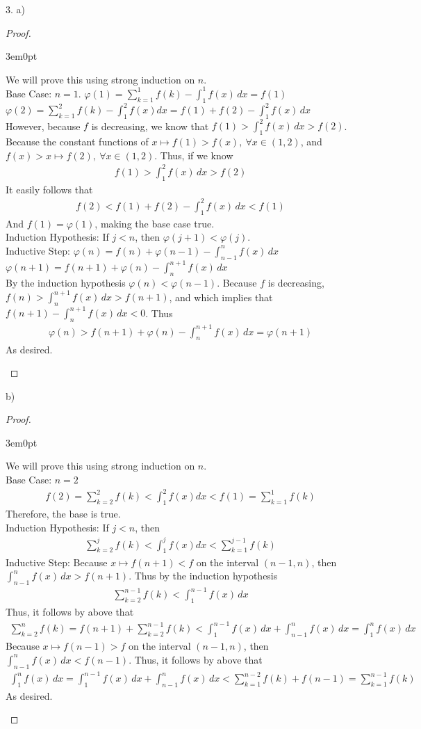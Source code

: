 \documentclass[11pt]{article}
\newcommand{\nskip}{\\ \bigskip}
\newenvironment{myproof}
{\begin{proof} \begin{adjustwidth}{3em}{0pt}$ $\par\nobreak\ignorespaces}
{\end{adjustwidth} \end{proof}}
\begin{document}
\begin{flushleft}
3. a)

\begin{myproof}
We will prove this using strong induction on $n$. \nskip
Base Case: $n=1$. $\varphi(1) = \sum_{k=1}^1f(k) - \int_1^1f(x) \,dx = f(1)$ \nskip
$\varphi(2) = \sum_{k=1}^2f(k) - \int_1^2f(x)dx = f(1) + f(2) - \int_1^2f(x)\,dx$ \nskip
However, because $f$ is decreasing, we know that $f(1) > \int_1^2f(x) \,dx > f(2)$. Because the constant functions of $x \mapsto f(1) > f(x), \ \forall x \in (1,2)$, and $f(x) > x \mapsto f(2), \ \forall x \in (1,2)$. Thus, if we know
\begin{align*}
f(1) > \int_1^2f(x) \,dx > f(2)
\end{align*}
It easily follows that
\begin{align*}
f(2) < f(1) + f(2) - \int_1^2f(x)\,dx < f(1)
\end{align*}
And $f(1) = \varphi(1)$, making the base case true. \nskip
Induction Hypothesis: If $j < n$, then $\varphi (j+1) < \varphi (j)$. \nskip
Inductive Step: $\varphi(n) = f(n) + \varphi(n-1) - \int_{n-1}^nf(x) \,dx$ \nskip
$\varphi (n+1) = f(n+1) + \varphi (n) - \int_n^{n+1} f(x) \,dx$ \nskip
By the induction hypothesis $\varphi (n) < \varphi (n-1)$.
Because $f$ is decreasing, $f(n) > \int_n^{n+1}f(x) \,dx > f(n+1) $, and which implies that $f(n+1) - \int_n^{n+1}f(x) \,dx < 0$. Thus
\begin{align*}
\varphi(n) > f(n+1) + \varphi (n) - \int_n^{n+1}f(x) \,dx = \varphi (n+1)
\end{align*}
As desired.
\end{myproof}

b)

\begin{myproof}
We will prove this using strong induction on $n$. \nskip
Base Case: $n =2$
\begin{align*}
f(2) = \sum_{k=2}^2f(k) < \int_1^2f(x)dx < f(1) = \sum_{k=1}^1f(k)
\end{align*}
Therefore, the base is true. \nskip
Induction Hypothesis: If $j < n$, then 
\begin{align*}
\sum_{k=2}^jf(k) < \int_1^jf(x)dx < \sum_{k=1}^{j-1}f(k)
\end{align*}
Inductive Step: Because $x \mapsto f(n+1) < f$ on the interval $(n-1,n)$, then $\int_{n-1}^nf(x) \,dx > f(n+1)$. Thus by the induction hypothesis
\begin{align*}
\sum_{k=2}^{n-1} f(k) < \int_1^{n-1} f(x) \,dx
\end{align*}
Thus, it follows by above that 
\begin{align*}
\sum_{k=2}^n f(k) = f(n+1) + \sum_{k=2}^{n-1} f(k)  < \int_1^{n-1} f(x) \,dx + \int_{n-1}^n f(x) \,dx = \int_1^n f(x) \,dx
\end{align*}
Because $x \mapsto f(n-1) > f$ on the interval $(n-1,n)$, then $\int_{n-1}^n f(x) \,dx < f(n-1)$.
Thus, it follows by above that
\begin{align*}
\int_1^n f(x) \,dx = \int_1^{n-1} f(x) \,dx + \int_{n-1}^n f(x) \,dx < \sum_{k=1}^{n-2}f(k) + f(n-1) = \sum_{k=1}^{n-1} f(k)
\end{align*}
As desired.
\end{myproof}


\end{flushleft}
\end{document}
